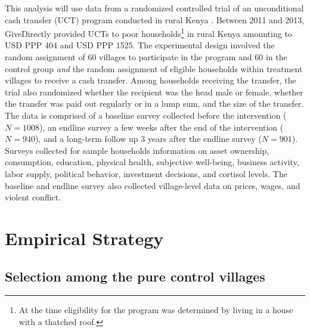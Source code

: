 \documentclass[11pt]{article}
\begin{document}
    This analysis will use data from a randomized controlled trial of an unconditional cash transfer (UCT) program conducted in rural Kenya \parencite{haushofer_short-term_2016}. Between 2011 and 2013, GiveDirectly provided UCTs to poor households\footnote{At the time eligibility for the program was determined by living in a house with a thatched roof.} in rural Kenya amounting to USD PPP 404 and USD PPP 1525. The experimental design involved the random assignment of 60 villages to participate in the program and 60 in the control group \textit{and} the random assignment of eligible households within treatment villages to receive a cash transfer. Among households receiving the transfer, the trial also randomized whether the recipient was the head male or female, whether the transfer was paid out regularly or in a lump sum, and the size of the transfer. The data is comprised of a baseline survey collected before the intervention ($N=1008$), an endline survey a few weeks after the end of the intervention ($N=940$), and a long-term follow up 3 years after the endline survey ($N=901$). Surveys collected for sample households information on asset ownership, consumption, education, physical health, subjective well-being, business activity, labor supply, political behavior, investment decisions, and cortisol levels. The baseline and endline survey also collected village-level data on prices, wages, and violent conflict.

\section{Empirical Strategy}

    \subsection{Selection among the pure control villages}
\end{document}
